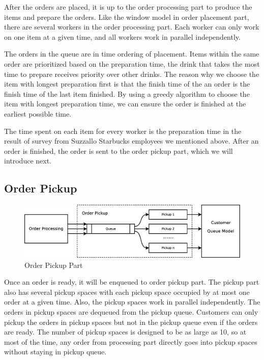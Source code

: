 \documentclass[a4paper]{article}
\begin{document}
After the orders are placed, it is up to the order processing part to produce the items and prepare the orders. Like the window model in order placement part, there are several workers in the order processing part. Each worker can only work on one item at a given time, and all workers work in parallel independently.

The orders in the queue are in time ordering of placement. Items within the same order are prioritized based on the preparation time, the drink that takes the most time to prepare receives priority over other drinks. The reason why we choose the item with longest preparation first is that the finish time of the an order is the finish time of the last item finished. By using a greedy algorithm to choose the item with longest preparation time, we can ensure the order is finished at the earliest possible time. 

The time spent on each item for every worker is the preparation time in the result of survey from Suzzallo Starbucks employees we mentioned above. After an order is finished, the order is sent to the order pickup part, which we will introduce next.

\subsection{Order Pickup}

\begin{figure}[H]
	\centering
	\includegraphics[width=0.60\textheight]{order_pickup}
	\caption{Order Pickup Part}
\end{figure}

Once an order is ready, it will be enqueued to order pickup part. The pickup part also has several pickup spaces with each pickup space occupied by at most one order at a given time. Also, the pickup spaces work in parallel independently. The orders in pickup spaces are dequeued from the pickup queue. Customers can only pickup the orders in pickup spaces but not in the pickup queue even if the orders are ready. The number of pickup spaces is designed to be as large as 10, so at most of the time, any order from processing part directly goes into pickup spaces without staying in pickup queue.
\end{document}
